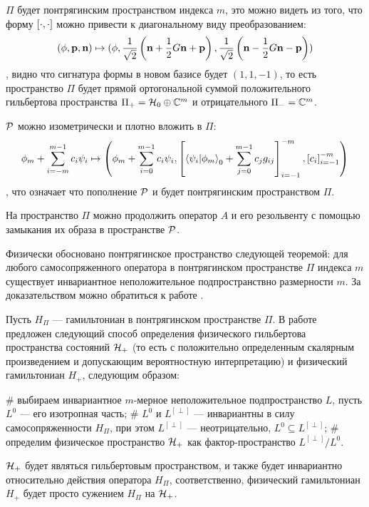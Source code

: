 $\Pi$ будет понтрягинским пространством индекса $m$, это можно видеть из того, что форму $[\cdot,\cdot]$ можно привести к диагональному виду преобразованием:
\[
(\phi, \vb{p}, \vb{n})
\mapsto
(\phi,
\frac{1}{\sqrt{2}} \left( \vb{n} + \frac{1}{2} G \vb{n} + \vb{p} \right),
\frac{1}{\sqrt{2}} \left( \vb{n} - \frac{1}{2} G \vb{n} - \vb{p} \right))
\]
, видно что сигнатура формы в новом базисе будет $(1, 1, -1)$, то есть пространство $\Pi$ будет прямой ортогональной суммой положительного гильбертова пространства $\Pi_+ = \mathcal{H}_{0} \oplus \mathbb{C}^m$ и отрицательного $\Pi_- = \mathbb{C}^m$.


$\mathcal{P}$ можно изометрически и плотно вложить в $\Pi$:
\[
\phi_m + \sum\limits_{i = -m}^{m - 1} c_i \psi_i \mapsto
\left(
\phi_m + \sum\limits_{i = 0}^{m - 1} c_i \psi_i,
\left[ \ip{\psi_i}{\phi_m}_0 + \sum\limits_{j = 0}^{m - 1} c_j g_{ij} \right]_{i = -1}^{-m},
\left[ c_i \right]_{i = -1}^{-m}
\right)
\]
, что означает что пополнение $\mathcal{P}$ и будет понтрягинским пространством $\Pi$.

На пространство $\Pi$ можно продолжить оператор $A$ и его резольвенту с помощью замыкания их образа в пространстве $\mathcal{P}$.

Физически обосновано понтрягинское пространство следующей теоремой: для любого самосопряженного оператора в понтрягинском пространстве $\Pi$ индекса $m$ существует инвариантное неположительное подпространствно размерности $m$. За доказательством можно обратиться к работе \cite{pontryagin1944hermetian}.

Пусть $H_\Pi$ — гамильтониан в понтрягинском пространстве $\Pi$. В работе \cite{shondin1995pertrubations} предложен следующий способ определения физического гильбертова пространства состояний $\mathcal{H}_{+}$ (то есть с положительно определенным скалярным произведением и допускающим вероятностную интерпретацию) и физический гамильтониан $H_+$, следующим образом: 
\begin{elist}
# выбираем инвариантное $m$-мерное неположительное подпространство $L$, пусть $L^0$ — его изотропная часть;
# $L^0$ и $L^{[\perp]}$ — инвариантны в силу самосопряженности $H_\Pi$, при этом $L^{[\perp]}$ — неотрицательно, $L^0 \subseteq L^{[\perp]}$;
# определим физическое пространство $\mathcal{H}_{+}$ как фактор-пространство $L^{[\perp]} / L^0$.
\end{elist}
$\mathcal{H}_{+}$ будет являться гильбертовым пространством, и также будет инвариантно относительно действия оператора $H_\Pi$, соответственно, физический гамильтониан $H_+$ будет просто сужением $H_\Pi$ на $\mathcal{H}_{+}$.

